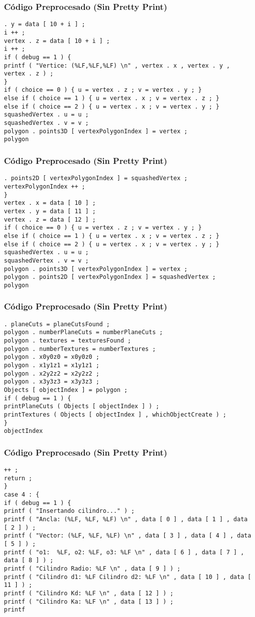 \documentclass{beamer}
\begin{document}
\begin{frame}[fragile]
\frametitle{C\'odigo Preprocesado (Sin Pretty Print)}
\begin{lstlisting}[style=CStyle]
. y = data [ 10 + i ] ; 
i ++ ; 
vertex . z = data [ 10 + i ] ; 
i ++ ; 
if ( debug == 1 ) { 
printf ( "Vertice: (%LF,%LF,%LF) \n" , vertex . x , vertex . y , vertex . z ) ; 
} 
if ( choice == 0 ) { u = vertex . z ; v = vertex . y ; } 
else if ( choice == 1 ) { u = vertex . x ; v = vertex . z ; } 
else if ( choice == 2 ) { u = vertex . x ; v = vertex . y ; } 
squashedVertex . u = u ; 
squashedVertex . v = v ; 
polygon . points3D [ vertexPolygonIndex ] = vertex ; 
polygon \end{lstlisting}
\end{frame}
\begin{frame}[fragile]
\frametitle{C\'odigo Preprocesado (Sin Pretty Print)}
\begin{lstlisting}[style=CStyle]
. points2D [ vertexPolygonIndex ] = squashedVertex ; 
vertexPolygonIndex ++ ; 
} 
vertex . x = data [ 10 ] ; 
vertex . y = data [ 11 ] ; 
vertex . z = data [ 12 ] ; 
if ( choice == 0 ) { u = vertex . z ; v = vertex . y ; } 
else if ( choice == 1 ) { u = vertex . x ; v = vertex . z ; } 
else if ( choice == 2 ) { u = vertex . x ; v = vertex . y ; } 
squashedVertex . u = u ; 
squashedVertex . v = v ; 
polygon . points3D [ vertexPolygonIndex ] = vertex ; 
polygon . points2D [ vertexPolygonIndex ] = squashedVertex ; 
polygon \end{lstlisting}
\end{frame}
\begin{frame}[fragile]
\frametitle{C\'odigo Preprocesado (Sin Pretty Print)}
\begin{lstlisting}[style=CStyle]
. planeCuts = planeCutsFound ; 
polygon . numberPlaneCuts = numberPlaneCuts ; 
polygon . textures = texturesFound ; 
polygon . numberTextures = numberTextures ; 
polygon . x0y0z0 = x0y0z0 ; 
polygon . x1y1z1 = x1y1z1 ; 
polygon . x2y2z2 = x2y2z2 ; 
polygon . x3y3z3 = x3y3z3 ; 
Objects [ objectIndex ] = polygon ; 
if ( debug == 1 ) { 
printPlaneCuts ( Objects [ objectIndex ] ) ; 
printTextures ( Objects [ objectIndex ] , whichObjectCreate ) ; 
} 
objectIndex \end{lstlisting}
\end{frame}
\begin{frame}[fragile]
\frametitle{C\'odigo Preprocesado (Sin Pretty Print)}
\begin{lstlisting}[style=CStyle]
++ ; 
return ; 
} 
case 4 : { 
if ( debug == 1 ) { 
printf ( "Insertando cilindro..." ) ; 
printf ( "Ancla: (%LF, %LF, %LF) \n" , data [ 0 ] , data [ 1 ] , data [ 2 ] ) ; 
printf ( "Vector: (%LF, %LF, %LF) \n" , data [ 3 ] , data [ 4 ] , data [ 5 ] ) ; 
printf ( "o1:  %LF, o2: %LF, o3: %LF \n" , data [ 6 ] , data [ 7 ] , data [ 8 ] ) ; 
printf ( "Cilindro Radio: %LF \n" , data [ 9 ] ) ; 
printf ( "Cilindro d1: %LF Cilindro d2: %LF \n" , data [ 10 ] , data [ 11 ] ) ; 
printf ( "Cilindro Kd: %LF \n" , data [ 12 ] ) ; 
printf ( "Cilindro Ka: %LF \n" , data [ 13 ] ) ; 
printf \end{lstlisting}
\end{frame}
\end{document}
